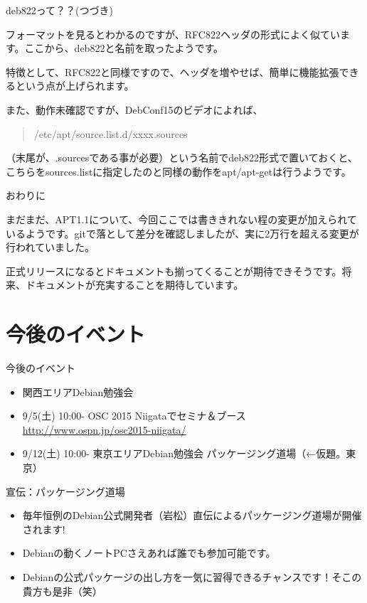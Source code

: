 \begin{frame}{deb822って？？(つづき)}

  フォーマットを見るとわかるのですが、RFC822ヘッダの形式によく似ています。ここから、deb822と名前を取ったようです。

  特徴として、RFC822と同様ですので、ヘッダを増やせば、簡単に機能拡張できるという点が上げられます。

  また、動作未確認ですが、DebConf15のビデオによれば、
\begin{quote}
  /etc/apt/source.list.d/xxxx.sources
\end{quote}
（末尾が、.sourcesである事が必要）という名前でdeb822形式で置いておくと、
こちらをsources.listに指定したのと同様の動作をapt/apt-getは行うようです。
\end{frame}


\begin{frame}{おわりに}

  まだまだ、APT1.1について、今回ここでは書ききれない程の変更が加えられているようです。gitで落として差分を確認しましたが、実に2万行を超える変更が行われていました。
  
  正式リリースになるとドキュメントも揃ってくることが期待できそうです。将来、ドキュメントが充実することを期待しています。
  
\end{frame}

\section{今後のイベント}
\begin{frame}{今後のイベント}
\begin{itemize}
 \item 関西エリアDebian勉強会
 \item 9/5(土) 10:00- OSC 2015 Niigataでセミナ＆ブース\\
\url{http://www.ospn.jp/osc2015-niigata/}
 \item 9/12(土) 10:00- 東京エリアDebian勉強会 パッケージング道場（←仮題。東京）
\end{itemize}
\end{frame}

\begin{frame}{宣伝：パッケージング道場}

 \begin{itemize}
  \item 毎年恒例のDebian公式開発者（岩松）直伝によるパッケージング道場が開催されます!
  \item Debianの動くノートPCさえあれば誰でも参加可能です。
  \item Debianの公式パッケージの出し方を一気に習得できるチャンスです！そこの貴方も是非（笑）
 \end{itemize}

\end{frame}
  
